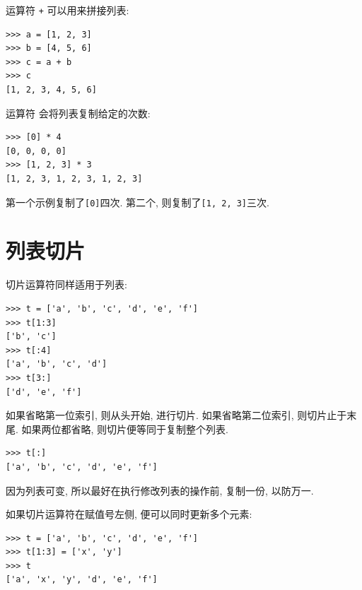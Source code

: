 \documentclass[10pt]{book}
\begin{document}
运算符 {\tt +} 可以用来拼接列表:

\begin{verbatim}
>>> a = [1, 2, 3]
>>> b = [4, 5, 6]
>>> c = a + b
>>> c
[1, 2, 3, 4, 5, 6]
\end{verbatim}
%

运算符 {\tt *} 会将列表复制给定的次数:

\begin{verbatim}
>>> [0] * 4
[0, 0, 0, 0]
>>> [1, 2, 3] * 3
[1, 2, 3, 1, 2, 3, 1, 2, 3]
\end{verbatim}
%
第一个示例复制了{\tt [0]}四次. 
第二个, 则复制了{\tt [1, 2, 3]}三次. 


\section{列表切片}

切片运算符同样适用于列表:

\begin{verbatim}
>>> t = ['a', 'b', 'c', 'd', 'e', 'f']
>>> t[1:3]
['b', 'c']
>>> t[:4]
['a', 'b', 'c', 'd']
>>> t[3:]
['d', 'e', 'f']
\end{verbatim}
%
如果省略第一位索引, 则从头开始, 进行切片. 
如果省略第二位索引, 则切片止于末尾. 
如果两位都省略, 则切片便等同于复制整个列表. 

\begin{verbatim}
>>> t[:]
['a', 'b', 'c', 'd', 'e', 'f']
\end{verbatim}
%
因为列表可变, 所以最好在执行修改列表的操作前, 复制一份, 以防万一. 

如果切片运算符在赋值号左侧, 便可以同时更新多个元素:

\begin{verbatim}
>>> t = ['a', 'b', 'c', 'd', 'e', 'f']
>>> t[1:3] = ['x', 'y']
>>> t
['a', 'x', 'y', 'd', 'e', 'f']
\end{verbatim}
%


%
\end{document}
